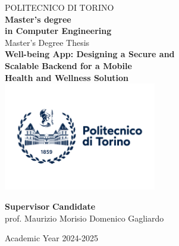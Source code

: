 \begin{titlepage}
    
    \begin{center}
    
    {\huge POLITECNICO DI TORINO}\\[1.5cm]
    \textbf{Master’s degree\\in Computer Engineering}\\[3cm]
    
    {\Large Master's Degree Thesis}\\[0.5cm]
    \textbf{\LARGE Well-being App: Designing a Secure and\\[-0.2cm]Scalable Backend for a Mobile\\[0.2cm]Health and Wellness Solution}\\[2cm]
    \includegraphics[width=0.5\textwidth]{./images/logoPoliTo_with_name_2021.jpg}
    \vspace{2cm}
    
    
    \begin{minipage}{0.85\textwidth}
    \begin{flushleft}\large
    \textbf{Supervisor} \hfill \textbf{Candidate}\\
    prof. Maurizio Morisio \hfill Domenico Gagliardo\\
    \end{flushleft}
    \end{minipage}
    
    \vfill
    
    Academic Year 2024-2025
    \end{center}
    
    \restoregeometry %
    
\end{titlepage}
\newpage
\thispagestyle{empty}
\mbox{}
\newpage
\newpage
\begin{spacing}{\myspacing}
    \clearpage
    \setcounter{page}{3}
    \pagestyle{plain}  %
    
\end{spacing}

\newpage
\tableofcontents
\newpage
